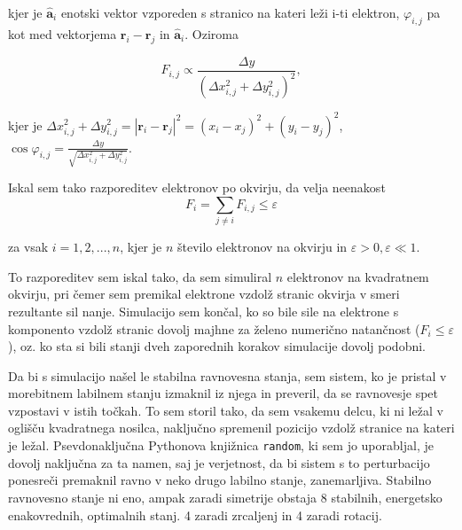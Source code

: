 \documentclass[a4paper,11pt]{article}
\begin{document}
    \noindent
    kjer je $\hat{\mathbf{a}}_i$ enotski vektor vzporeden s stranico na kateri le\v zi i-ti elektron, $\varphi_{i,j}$ pa kot med
    vektorjema $ \mathbf{r}_{i} - \mathbf{r}_{j}$ in $\hat{\mathbf{a}}_i$. Oziroma

    $$ F_{i, j} \propto \frac{\Delta y}{(\Delta x_{i,j} ^2 + \Delta y_{i,j} ^2)^2} , $$

    \noindent
    kjer je $\Delta x_{i,j} ^2 + \Delta y_{i,j} ^2 = \left\vert \mathbf{r}_{i} - \mathbf{r}_{j} \right\vert ^2 = (x_i - x_j)^2
    + (y_i - y_j) ^2$, $\cos{\varphi_{i,j}} = \frac{\Delta y}{\sqrt{\Delta x_{i,j} ^2 + \Delta y_{i,j} ^2}}$.


    \noindent
    Iskal sem tako razporeditev elektronov po okvirju, da velja neenakost
    $$F_i = \sum_{j \neq i} F_{i,j} \leq \varepsilon $$

    \noindent
    za vsak $i = 1, 2, ..., n$, kjer je $n$ \v stevilo elektronov na okvirju in $\varepsilon > 0, \varepsilon \ll 1$.


    \vspace{10pt}
    To razporeditev sem iskal tako, da sem simuliral $n$ elektronov na kvadratnem okvirju, pri \v cemer
    sem premikal elektrone vzdol\v z stranic okvirja v smeri rezultante sil nanje. Simulacijo sem kon\v cal, ko
    so bile sile na elektrone s komponento vzdol\v z stranic dovolj majhne za \v zeleno numeri\v cno natan\v cnost
    ($ F_i \leq \varepsilon $),
    oz. ko sta si bili stanji dveh zaporednih korakov simulacije dovolj podobni.

    \vspace{10pt}
    Da bi s simulacijo na\v sel le stabilna ravnovesna stanja, sem sistem, ko je pristal v morebitnem labilnem stanju
    izmaknil iz njega in preveril, da se ravnovesje spet vzpostavi v istih to\v ckah. To sem storil tako,
    da sem vsakemu delcu, ki ni le\v zal v ogli\v s\v cu kvadratnega nosilca, naklju\v cno spremenil
    pozicijo vzdol\v z stranice na kateri je le\v zal. Psevdonaklju\v cna Pythonova knji\v znica \texttt{random}, ki sem
    jo uporabljal, je dovolj naklju\v cna za ta namen, saj je verjetnost, da bi sistem s to perturbacijo ponesre\v ci
    premaknil ravno v neko drugo labilno stanje, zanemarljiva. Stabilno ravnovesno stanje ni eno, ampak zaradi simetrije
    obstaja 8 stabilnih, energetsko enakovrednih, optimalnih stanj. 4 zaradi zrcaljenj in 4 zaradi rotacij.

\end{document}
